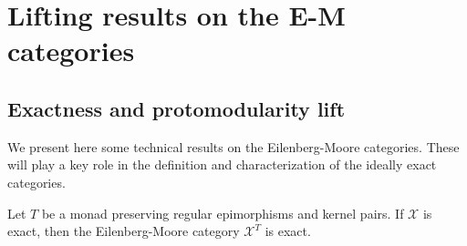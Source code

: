 \chapter{Lifting results on the E-M categories}

\fontsize{12}{14.5}\selectfont

\section{Exactness and protomodularity lift}

We present here some technical results on the Eilenberg-Moore categories. These will play a key role in the definition and characterization of the ideally exact categories.

\begin{mainbox}{}
    \begin{prop}\label{algebras category is exact if the base category is exact}
        Let $T$ be a monad preserving regular epimorphisms and kernel pairs. If $\mathcal{X}$ is exact, then the Eilenberg-Moore category $\mathcal{X}^T$ is exact.
    \end{prop}
\end{mainbox}

